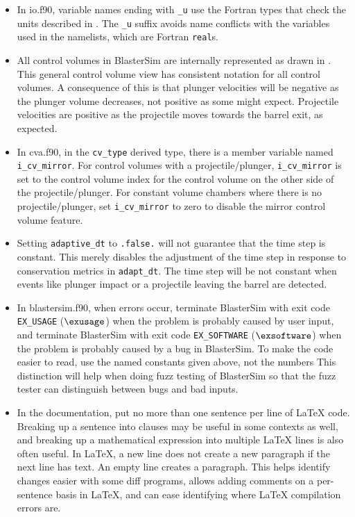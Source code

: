 \begin{itemize}
\item In io.f90, variable names ending with \texttt{\_u} use the Fortran types that check the units described in .
The \texttt{\_u} suffix avoids name conflicts with the variables used in the namelists, which are Fortran \texttt{real}s.

\item All control volumes in BlasterSim are internally represented as drawn in .
This general control volume view has consistent notation for all control volumes.
A consequence of this is that plunger velocities will be negative as the plunger volume decreases, not positive as some might expect.
Projectile velocities are positive as the projectile moves towards the barrel exit, as expected.

\item In cva.f90, in the \texttt{cv\_type} derived type, there is a member variable named \texttt{i\_cv\_mirror}.
For control volumes with a projectile/plunger, \texttt{i\_cv\_mirror} is set to the control volume index for the control volume on the other side of the projectile/plunger.
For constant volume chambers where there is no projectile/plunger, set \texttt{i\_cv\_mirror} to zero to disable the mirror control volume feature.

\item Setting \texttt{adaptive\_dt} to \texttt{.false.} will not guarantee that the time step is constant.
This merely disables the adjustment of the time step in response to conservation metrics in \texttt{adapt\_dt}.
The time step will be not constant when events like plunger impact or a projectile leaving the barrel are detected.

\item In blastersim.f90, when errors occur, terminate BlasterSim with exit code \texttt{EX\_USAGE} ($\exusage$) when the problem is probably caused by user input, and terminate BlasterSim with exit code \texttt{EX\_SOFTWARE} ($\exsoftware$) when the problem is probably caused by a bug in BlasterSim.
To make the code easier to read, use the named constants given above, not the numbers
This distinction will help when doing fuzz testing of BlasterSim so that the fuzz tester can distinguish between bugs and bad inputs.

\item In the documentation, put no more than one sentence per line of LaTeX code.
Breaking up a sentence into clauses may be useful in some contexts as well,
and breaking up a mathematical expression into multiple LaTeX lines is also often useful.
In LaTeX, a new line does not create a new paragraph if the next line has text.
An empty line creates a paragraph.
This helps identify changes easier with some diff programs,
allows adding comments on a per-sentence basis in LaTeX,
and can ease identifying where LaTeX compilation errors are.
\end{itemize}

